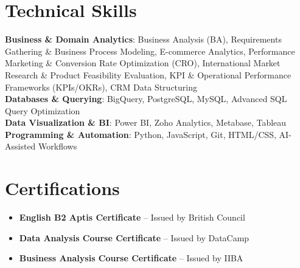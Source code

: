 \documentclass[letterpaper,11pt]{article}
\newcommand{\resumeItem}[1]{
  \item\small{
    {#1 \vspace{1pt}}
  }
}
\newcommand{\resumeItemListStart}{\begin{itemize}[leftmargin=0.15in, itemsep=2.5pt, topsep=2pt, parsep=1.5pt]}
\newcommand{\resumeItemListEnd}{\end{itemize}\vspace{2pt}}
\begin{document}
\section*{Technical Skills}
 \begin{itemize}[leftmargin=0.15in, label={}]
    \small{\item{
     \textbf{Business \& Domain Analytics}: {Business Analysis (BA), Requirements Gathering \& Business Process Modeling, E-commerce Analytics, Performance Marketing \& Conversion Rate Optimization (CRO), International Market Research \& Product Feasibility Evaluation, KPI \& Operational Performance Frameworks (KPIs/OKRs), CRM Data Structuring} \\ \vspace{2pt}
     \textbf{Databases \& Querying}: {BigQuery, PostgreSQL, MySQL, Advanced SQL Query Optimization} \\ \vspace{2pt}
     \textbf{Data Visualization \& BI}: {Power BI, Zoho Analytics, Metabase, Tableau} \\ \vspace{2pt}
     \textbf{Programming \& Automation}: {Python, JavaScript, Git, HTML/CSS, AI-Assisted Workflows}
    }}
 \end{itemize}

\section*{Certifications}
        \resumeItemListStart
      \resumeItem{\textbf{English B2 Aptis Certificate} -- Issued by British Council}
      \resumeItem{\textbf{Data Analysis Course Certificate} -- Issued by DataCamp}
      \resumeItem{\textbf{Business Analysis Course Certificate} -- Issued by IIBA}
      \resumeItemListEnd

\end{document}

